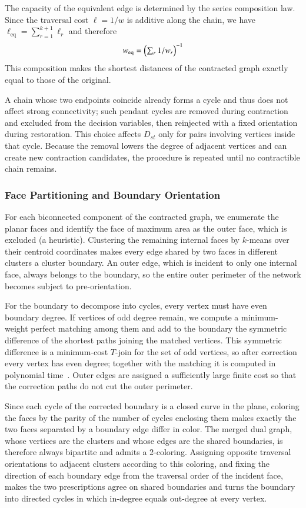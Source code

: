 \documentclass[twocolumn,a4paper]{article}
\begin{document}
The capacity of the equivalent edge is determined by the series composition law. Since the traversal cost \(\ell=1/w\) is additive along the chain, we have \(\ell_{\mathrm{eq}}=\sum_{r=1}^{k+1}\ell_r\) and therefore
\begin{equation}
    w_{\mathrm{eq}}=\Bigl(\textstyle\sum_{r}1/w_{r}\Bigr)^{-1}
\end{equation}
This composition makes the shortest distances of the contracted graph exactly equal to those of the original.

A chain whose two endpoints coincide already forms a cycle and thus does not affect strong connectivity; such pendant cycles are removed during contraction and excluded from the decision variables, then reinjected with a fixed orientation during restoration. This choice affects \(D_{st}\) only for pairs involving vertices inside that cycle. Because the removal lowers the degree of adjacent vertices and can create new contraction candidates, the procedure is repeated until no contractible chain remains.

\subsubsection*{Face Partitioning and Boundary Orientation}

For each biconnected component of the contracted graph, we enumerate the planar faces and identify the face of maximum area as the outer face, which is excluded (a heuristic). Clustering the remaining internal faces by $k$-means over their centroid coordinates makes every edge shared by two faces in different clusters a cluster boundary. An outer edge, which is incident to only one internal face, always belongs to the boundary, so the entire outer perimeter of the network becomes subject to pre-orientation.

For the boundary to decompose into cycles, every vertex must have even boundary degree. If vertices of odd degree remain, we compute a minimum-weight perfect matching among them and add to the boundary the symmetric difference of the shortest paths joining the matched vertices. This symmetric difference is a minimum-cost \(T\)-join for the set of odd vertices, so after correction every vertex has even degree; together with the matching it is computed in polynomial time~\cite{edmonds1973matching}. Outer edges are assigned a sufficiently large finite cost so that the correction paths do not cut the outer perimeter.

Since each cycle of the corrected boundary is a closed curve in the plane, coloring the faces by the parity of the number of cycles enclosing them makes exactly the two faces separated by a boundary edge differ in color. The merged dual graph, whose vertices are the clusters and whose edges are the shared boundaries, is therefore always bipartite and admits a 2-coloring. Assigning opposite traversal orientations to adjacent clusters according to this coloring, and fixing the direction of each boundary edge from the traversal order of the incident face, makes the two prescriptions agree on shared boundaries and turns the boundary into directed cycles in which in-degree equals out-degree at every vertex.
\end{document}
